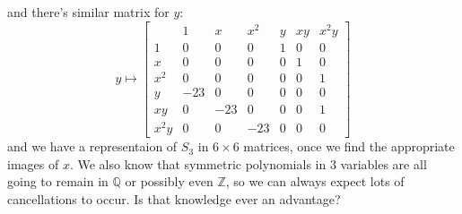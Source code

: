 \documentclass[12pt]{article}
\begin{document}
and there's similar matrix for $y$:
$$ y \mapsto
\left[ 
\begin{array}{l||ccc|ccc}
 & 1 & x & x^2 & y & xy & x^2 y \\ \hline \hline
 1 &  0 & 0 & 0 & 1 & 0 & 0 \\
 x &  0 & 0 & 0 & 0 & 1 & 0 \\
 x^2 & 0 & 0 & 0 & 0 & 0 & 1 \\ \hline
 y & -23 & 0 & 0 & 0 & 0 & 0 \\
 xy & 0 & -23 & 0 & 0 & 0 & 1 \\
 x^2 y & 0 & 0 & -23 & 0 & 0 & 0 
\end{array}\right] $$
and we have a representaion of $S_3$ in $6 \times 6$ matrices, once we find the appropriate images of $x$.  We also know that symmetric polynomials in 3 variables are all going to remain in $\mathbb{Q}$ or possibly even $\mathbb{Z}$, so we can always expect lots of cancellations to occur.  Is that knowledge ever an advantage?
\end{document}
